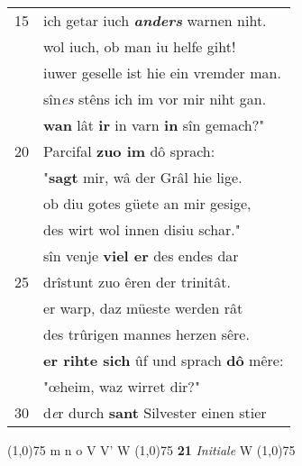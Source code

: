 \documentclass[8pt,a4paper,notitlepage]{article}
\begin{document}
\begin{table}[ht]
\begin{minipage}[t]{0.5\linewidth}
\begin{tabular}{rl}
15 & ich getar iuch \textit{\textbf{anders}} warnen niht.\\ 
 & wol iuch, ob man iu helfe giht!\\ 
 & iuwer geselle ist hie ein vremder man.\\ 
 & sîn\textit{es} stêns ich im vor mir niht gan.\\ 
 & \textbf{wan} lât \textbf{ir} in varn \textbf{in} sîn gemach?"\\ 
20 & Parcifal \textbf{zuo im} dô sprach:\\ 
 & "\textbf{sagt} mir, wâ der Grâl hie lige.\\ 
 & ob diu gotes güete an mir gesige,\\ 
 & des wirt wol innen disiu schar."\\ 
 & sîn venje \textbf{viel er} des endes dar\\ 
25 & drîstunt zuo êren der trinitât.\\ 
 & er warp, daz müeste werden rât\\ 
 & des trûrigen mannes herzen sêre.\\ 
 & \textbf{er rihte sich} ûf und sprach \textbf{dô} mêre:\\ 
 & "œheim, waz wirret dir?"\\ 
30 & d\textit{e}r durch \textbf{sant} Silvester einen stier\\ 
\end{tabular}
\scriptsize
\line(1,0){75} \newline
m n o V V' W \newline
\line(1,0){75} \newline
\textbf{21} \textit{Initiale} W  \newline
\line(1,0){75} \newline

\end{minipage}
\end{table}
\end{document}
